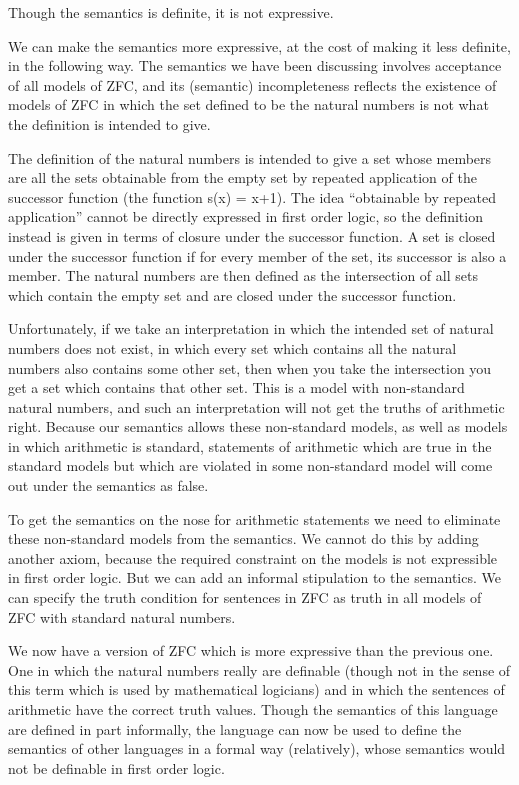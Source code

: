 Though the semantics is definite, it is not expressive.

We can make the semantics more expressive, at the cost of making it
less definite, in the following way.
The semantics we have been discussing involves acceptance of all
models of ZFC, and its (semantic) incompleteness reflects the
existence of models of ZFC in which the set defined to be the natural
numbers is not what the definition is intended to give.

The definition of the natural numbers is intended to give a set whose
members are all the sets obtainable from the empty set by repeated
application of the successor function (the function s(x) = x+1).
The idea ``obtainable by repeated application'' cannot be directly
expressed in first order logic, so the definition instead is given in
terms of closure under the successor function.
A set is closed under the successor function if for every member of
the set, its successor is also a member.
The natural numbers are then defined as the intersection of all sets
which contain the empty set and are closed under the successor
function.

Unfortunately, if we take an interpretation in which the intended set
of natural numbers does not exist, in which every set which contains
all the natural numbers also contains some other set, then when you
take the intersection you get a set which contains that other set.
This is a model with non-standard natural numbers, and such an
interpretation will not get the truths of arithmetic right.
Because our semantics allows these non-standard models, as well as
models in which arithmetic is standard, statements of arithmetic which
are true in the standard models but which are violated in some
non-standard model will come out under the semantics as false.

To get the semantics on the nose for arithmetic statements we need to
eliminate these non-standard models from the semantics.
We cannot do this by adding another axiom, because the required
constraint on the models is not expressible in first order logic.
But we can add an informal stipulation to the semantics.
We can specify the truth condition for sentences in ZFC as truth in
all models of ZFC with standard natural numbers.

We now have a version of ZFC which is more expressive than the
previous one.
One in which the natural numbers really are definable (though not in
the sense of this term which is used by mathematical logicians) and in
which the sentences of arithmetic have the correct truth values.
Though the semantics of this language are defined in part informally,
the language can now be used to define the semantics of other
languages in a formal way (relatively), whose semantics would not be
definable in first order logic.

